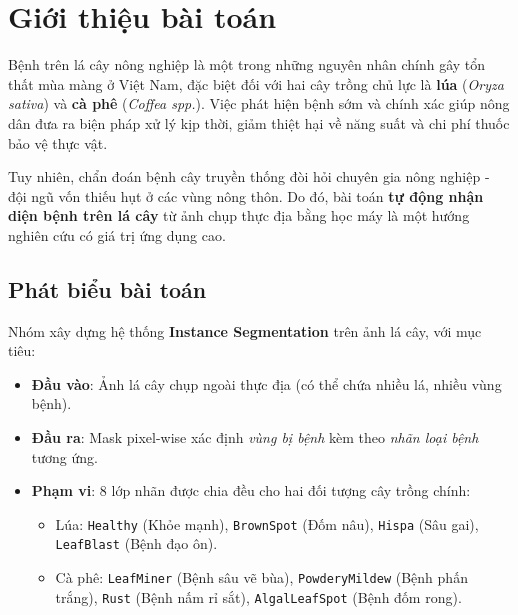 
\section{Giới thiệu bài toán}
\label{sec:intro}

Bệnh trên lá cây nông nghiệp là một trong những nguyên nhân chính gây tổn thất mùa màng ở Việt Nam, đặc biệt đối với hai cây trồng chủ lực là \textbf{lúa} (\textit{Oryza sativa}) và \textbf{cà phê} (\textit{Coffea spp.}). Việc phát hiện bệnh sớm và chính xác giúp nông dân đưa ra biện pháp xử lý kịp thời, giảm thiệt hại về năng suất và chi phí thuốc bảo vệ thực vật.

Tuy nhiên, chẩn đoán bệnh cây truyền thống đòi hỏi chuyên gia nông nghiệp - đội ngũ vốn thiếu hụt ở các vùng nông thôn. Do đó, bài toán \textbf{tự động nhận diện bệnh trên lá cây} từ ảnh chụp thực địa bằng học máy là một hướng nghiên cứu có giá trị ứng dụng cao.

\subsection{Phát biểu bài toán}

Nhóm xây dựng hệ thống \textbf{Instance Segmentation} trên ảnh lá cây, với mục tiêu:
\begin{itemize}
    \item \textbf{Đầu vào}: Ảnh lá cây chụp ngoài thực địa (có thể chứa nhiều lá, nhiều vùng bệnh).
    \item \textbf{Đầu ra}: Mask pixel-wise xác định \emph{vùng bị bệnh} kèm theo \emph{nhãn loại bệnh} tương ứng.
    \item \textbf{Phạm vi}: 8 lớp nhãn được chia đều cho hai đối tượng cây trồng chính:
          \begin{itemize}
              \item Lúa: \texttt{Healthy} (Khỏe mạnh), \texttt{BrownSpot} (Đốm nâu), \texttt{Hispa} (Sâu gai), \texttt{LeafBlast} (Bệnh đạo ôn).
              \item Cà phê: \texttt{LeafMiner} (Bệnh sâu vẽ bùa), \texttt{PowderyMildew} (Bệnh phấn trắng), \texttt{Rust} (Bệnh nấm rỉ sắt), \texttt{AlgalLeafSpot} (Bệnh đốm rong).
          \end{itemize}
\end{itemize}

